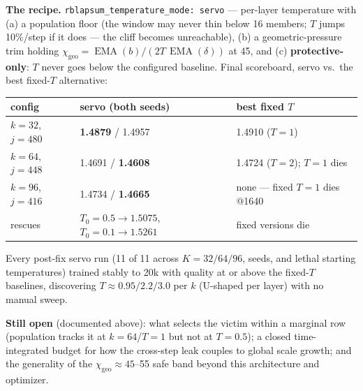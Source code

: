 \documentclass[11pt,a4paper]{article}
\newcommand{\code}[1]{\texttt{#1}}
\newcommand{\chigeo}{\chi_{\mathrm{geo}}}
\newcommand{\EMA}{\operatorname{EMA}}
\begin{document}
\textbf{The recipe.} \code{rblapsum\_temperature\_mode:\ servo} ---
per-layer temperature with (a) a population floor (the window may never thin
below 16 members; $T$ jumps 10\%/step if it does --- the cliff becomes
unreachable), (b) a geometric-pressure trim holding
$\chigeo = \EMA(b)/(2T\,\EMA(\delta))$ at 45, and (c)
\textbf{protective-only}: $T$ never goes below the configured baseline.
Final scoreboard, servo vs.\ the best fixed-$T$ alternative:

\begin{center}\small
\begin{tabular}{lll}
\toprule
config & servo (both seeds) & best fixed $T$ \\
\midrule
$k{=}32$, $j{=}480$ & \textbf{1.4879} / 1.4957 & 1.4910 ($T{=}1$) \\
$k{=}64$, $j{=}448$ & 1.4691 / \textbf{1.4608} & 1.4724 ($T{=}2$); $T{=}1$ dies \\
$k{=}96$, $j{=}416$ & 1.4734 / \textbf{1.4665} & none --- fixed $T{=}1$ dies @1640 \\
rescues & $T_0{=}0.5 \to 1.5075$, \; $T_0{=}0.1 \to 1.5261$ & fixed versions die \\
\bottomrule
\end{tabular}
\end{center}

Every post-fix servo run (11 of 11 across $K = 32/64/96$, seeds, and lethal
starting temperatures) trained stably to 20k with quality at or above the
fixed-$T$ baselines, discovering $T \approx 0.95/2.2/3.0$ per $k$ (U-shaped
per layer) with no manual sweep.

\textbf{Still open} (documented above): what selects the victim within a
marginal row (population tracks it at $k{=}64$/$T{=}1$ but not at $T{=}0.5$);
a closed time-integrated budget for how the cross-step leak couples to
global scale growth; and the generality of the $\chigeo \approx 45$--55
safe band beyond this architecture and optimizer.
\end{document}
